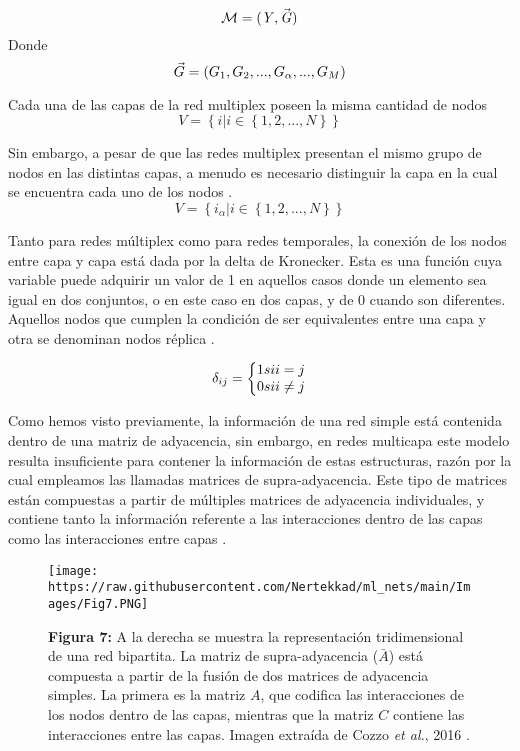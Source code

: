 \documentclass[
]{book}
\begin{document}
\[\cal{M} = \mathit{(Y,\vec{G})}\]
Donde
\[\vec{G} = (G_{1}, G_{2}, ... \space ,G_{\alpha}, ... \space ,G_{M})\]

Cada una de las capas de la red multiplex poseen la misma cantidad de nodos
\[V = \left \{ i|i \in \left \{ 1,2,...,N \right \} \right \}\]

Sin embargo, a pesar de que las redes multiplex presentan el mismo grupo de nodos en las distintas capas, a menudo es necesario distinguir la capa en la cual se encuentra cada uno de los nodos \citep{bianconi2018multilayer}.
\[V = \left \{ i_\alpha |i \in \left \{ 1,2,...,N \right \} \right \}\]

Tanto para redes múltiplex como para redes temporales, la conexión de los nodos entre capa y capa está dada por la delta de Kronecker. Esta es una función cuya variable puede adquirir un valor de 1 en aquellos casos donde un elemento sea igual en dos conjuntos, o en este caso en dos capas, y de 0 cuando son diferentes. Aquellos nodos que cumplen la condición de ser equivalentes entre una capa y otra se denominan nodos réplica \citep{gomez2013diffusion}.

\[\delta _{ij} = \left\{\begin{matrix}
1 \space si  \space i=j \\ 
0 \space si  \space i\neq j
\end{matrix}\right.\]

Como hemos visto previamente, la información de una red simple está contenida dentro de una matriz de adyacencia, sin embargo, en redes multicapa este modelo resulta insuficiente para contener la información de estas estructuras, razón por la cual empleamos las llamadas matrices de supra-adyacencia. Este tipo de matrices están compuestas a partir de múltiples matrices de adyacencia individuales, y contiene tanto la información referente a las interacciones dentro de las capas como las interacciones entre capas \citep{cozzo2016multilayer}.

\begin{figure}
\centering
\texttt{[image: https://raw.githubusercontent.com/Nertekkad/ml\_nets/main/Images/Fig7.PNG]}
\caption{\textbf{Figura 7:} A la derecha se muestra la representación tridimensional de una red bipartita. La matriz de supra-adyacencia (\(\bar{A}\)) está compuesta a partir de la fusión de dos matrices de adyacencia simples. La primera es la matriz \(A\), que codifica las interacciones de los nodos dentro de las capas, mientras que la matriz \(C\) contiene las interacciones entre las capas. Imagen extraída de Cozzo \emph{et al.}, 2016 \citep{cozzo2016multilayer}.}
\end{figure}
\end{document}

